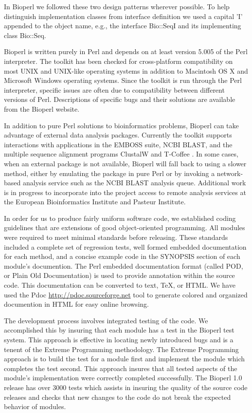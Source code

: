\documentclass[12pt]{article}
\begin{document}
In Bioperl we followed these two design patterns \cite{gangoffour}
wherever possible.  To help distinguish implementation classes from
interface definition we used a capital 'I' appended to the object
name, e.g., the interface Bio::SeqI and its implementing class
Bio::Seq.

Bioperl is written purely in Perl and depends on at least version 5.005
of the Perl interpreter.  The toolkit has been checked
for cross-platform compatibility on most UNIX and UNIX-like operating
systems in addition to Macintosh OS X and Microsoft Windows operating
systems.  Since the toolkit is run through the Perl interpreter,
specific issues are often due to compatibility between different
versions of Perl.  Descriptions of specific bugs and their solutions
are available from the Bioperl website.

In addition to pure Perl solutions to bioinformatics problems, Bioperl
can take advantage of external data analysis packages.  Currently the
toolkit supports interactions with applications in the EMBOSS
\cite{emboss} suite, NCBI BLAST, and the multiple sequence alignment
programs ClustalW \cite{clustalw} and T-Coffee \cite{tcoffee}.  In
some cases, when an external package is not available, Bioperl will
fall back to using a slower method, either by emulating the package in
pure Perl or by invoking a network-based analysis service such as the
NCBI BLAST analysis queue.  Additional work is in progress to
incorporate into the project access to remote analysis services at the
European Bioinformatics Institute and Pasteur Institute.

In order for us to produce fairly uniform software code, we established
coding guidelines that are extensions of good object-oriented
programming.  All modules were required to meet minimal standards
before releasing.  These standards included a complete set of
regression tests, well formed embedded documentation for each method,
and a concise example code in the SYNOPSIS section of each module's
documention.  The Perl embedded documentation format (called POD, or
Plain Old Documentation) is used to provide annotation within the
source code.  This documentation can be converted to text, TeX, or
HTML.  We have used the Pdoc \url{http://pdoc.sourceforge.net} tool to generate colored and
organized documention in HTML for easy online browsing.

The development process involves integrated testing of the code.  We
accomplished this by insuring that each module has a test in the
Bioperl test system.  This approach is effective in locating newly
introduced bugs and is a tenent of the Extreme
Programming\cite{xprogramming} methodology.  The Extreme Programming
approach is to build the test for a module first and implement the
module which completes the test second.  This approach insures that
all tested aspects of the module's implementation were correctly
completed successfully.  The Bioperl 1.0 release has over 3000 tests
which assists in insuring the quality of the source code releases and
checks that new changes to the code do not break the
expected behavior of modules.
\end{document}
